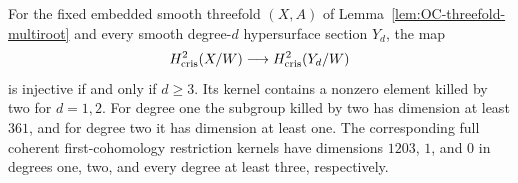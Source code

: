 \begin{theorem}
\label{thm:OC-exact-integral-injectivity-degrees}
For the fixed embedded smooth threefold $(X,A)$ of
Lemma~\ref{lem:OC-threefold-multiroot} and every smooth degree-$d$ hypersurface section $Y_d$, the map
\[
            H^2_{\mathrm{cris}}(X/W)\longrightarrow H^2_{\mathrm{cris}}(Y_d/W)
\]
is injective if and only if $d\geq3$.  Its kernel contains a nonzero element killed by two for $d=1,2$.
For degree one the subgroup killed by two has dimension at least $361$, and for degree two it has dimension at least one.
The corresponding full coherent first-cohomology restriction kernels have dimensions $1203$, $1$, and $0$ in degrees one, two, and every degree at least three, respectively.
\end{theorem}
